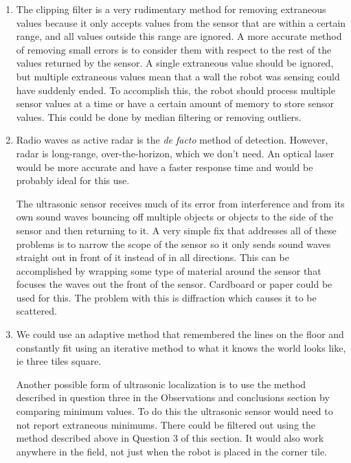 \documentclass[twocolumn]{article}
\begin{document}
\begin{enumerate}

\item
The clipping filter is a very rudimentary method for removing extraneous values because it only accepts values from the sensor that are within a certain range, and all values outside this range are ignored. A more accurate method of removing small errors is to consider them with respect to the rest of the values returned by the sensor. A single extraneous value should be ignored, but multiple extraneous values mean that a wall the robot was sensing could have suddenly ended. To accomplish this, the robot should process multiple sensor values at a time or have a certain amount of memory to store sensor values. This could be done by median filtering or removing outliers.

\item
Radio waves as active radar is the {\it de facto} method of detection.
However, radar is long-range, over-the-horizon, which we don't need.
An optical laser would be more accurate and have a faster response time and would be probably ideal for this use.

The ultrasonic sensor receives much of its error from interference and from its own sound waves bouncing off multiple objects or objects to the side of the sensor and then returning to it. A very simple fix that addresses all of these problems is to narrow the scope of the sensor so it only sends sound waves straight out in front of it instead of in all directions. This can be accomplished by wrapping some type of material around the sensor that focuses the waves out the front of the sensor. Cardboard or paper could be used for this. The problem with this is diffraction\cite{morse1948vibration} which causes it to be scattered.

\item
We could use an adaptive method that remembered the lines on the floor and constantly fit using an iterative method to what it knows the world looks like, ie three tiles square.

Another possible form of ultrasonic localization is to use the method described in question three in the Observations and conclusions section by comparing minimum values. To do this the ultrasonic sensor would need to not report extraneous minimums. There could be filtered out using the method described above in Question 3 of this section. It would also work anywhere in the field, not just when the robot is placed in the corner tile.

\end{enumerate}


\end{document}
